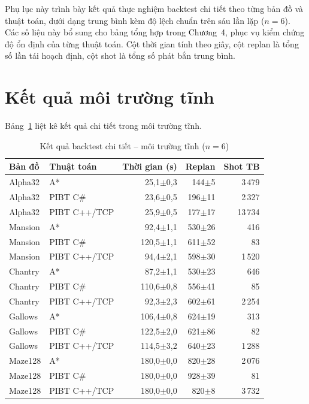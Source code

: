 \documentclass[../DoAn.tex]{subfiles}
\begin{document}
Phụ lục này trình bày kết quả thực nghiệm backtest chi tiết theo từng bản đồ và thuật
toán, dưới dạng trung bình kèm độ lệch chuẩn trên sáu lần lặp ($n=6$). Các số liệu này
bổ sung cho bảng tổng hợp trong Chương~4, phục vụ kiểm chứng độ ổn định của từng thuật
toán. Cột thời gian tính theo giây, cột replan là tổng số lần tái hoạch định, cột shot
là tổng số phát bắn trung bình.

\section{Kết quả môi trường tĩnh}

Bảng~\ref{tab:appendix_static} liệt kê kết quả chi tiết trong môi trường tĩnh.

\begin{table}[htbp]
\centering
\caption{Kết quả backtest chi tiết -- môi trường tĩnh ($n=6$)}
\label{tab:appendix_static}
\small
\begin{tabular}{|l|l|r|r|r|}
\hline
\textbf{Bản đồ} & \textbf{Thuật toán} & \textbf{Thời gian (s)} & \textbf{Replan} & \textbf{Shot TB} \\ \hline
Alpha32 & A* & 25,1$\pm$0,3 & 144$\pm$5 & 3\,479 \\
Alpha32 & PIBT C\# & 23,6$\pm$0,5 & 196$\pm$11 & 2\,327 \\
Alpha32 & PIBT C++/TCP & 25,9$\pm$0,5 & 177$\pm$17 & 13\,734 \\ \hline
Mansion & A* & 92,4$\pm$1,1 & 530$\pm$26 & 416 \\
Mansion & PIBT C\# & 120,5$\pm$1,1 & 611$\pm$52 & 83 \\
Mansion & PIBT C++/TCP & 94,4$\pm$2,1 & 598$\pm$30 & 1\,520 \\ \hline
Chantry & A* & 87,2$\pm$1,1 & 530$\pm$23 & 646 \\
Chantry & PIBT C\# & 110,6$\pm$0,8 & 556$\pm$41 & 85 \\
Chantry & PIBT C++/TCP & 92,3$\pm$2,3 & 602$\pm$61 & 2\,254 \\ \hline
Gallows & A* & 106,4$\pm$0,8 & 624$\pm$19 & 313 \\
Gallows & PIBT C\# & 122,5$\pm$2,0 & 621$\pm$86 & 82 \\
Gallows & PIBT C++/TCP & 114,5$\pm$3,2 & 640$\pm$23 & 1\,288 \\ \hline
Maze128 & A* & 180,0$\pm$0,0 & 820$\pm$28 & 2\,076 \\
Maze128 & PIBT C\# & 180,0$\pm$0,0 & 928$\pm$39 & 81 \\
Maze128 & PIBT C++/TCP & 180,0$\pm$0,0 & 820$\pm$8 & 3\,732 \\ \hline
\end{tabular}
\end{table}
\end{document}
